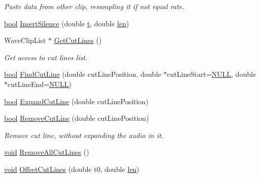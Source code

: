 \begin{DoxyCompactItemize}
\begin{DoxyCompactList}\small\item\em Paste data from other clip, resampling it if not equal rate. \end{DoxyCompactList}\item 
\hyperlink{mac_2config_2i386_2lib-src_2libsoxr_2soxr-config_8h_abb452686968e48b67397da5f97445f5b}{bool} \hyperlink{class_wave_clip_a3c7d2ee22cfb286a588c0f03abc5e470}{Insert\+Silence} (double \hyperlink{octave__test_8m_aaccc9105df5383111407fd5b41255e23}{t}, double \hyperlink{lib_2expat_8h_af86d325fecfc8f47b61fbf5a5146f582}{len})
\item 
Wave\+Clip\+List $\ast$ \hyperlink{class_wave_clip_a1c1ecfe9be3476335a2bf66d80774f03}{Get\+Cut\+Lines} ()
\begin{DoxyCompactList}\small\item\em Get access to cut lines list. \end{DoxyCompactList}\item 
\hyperlink{mac_2config_2i386_2lib-src_2libsoxr_2soxr-config_8h_abb452686968e48b67397da5f97445f5b}{bool} \hyperlink{class_wave_clip_a488b6cd7e76c282a1bf70200beb4d66c}{Find\+Cut\+Line} (double cut\+Line\+Position, double $\ast$cut\+Line\+Start=\hyperlink{px__mixer_8h_a070d2ce7b6bb7e5c05602aa8c308d0c4}{N\+U\+LL}, double $\ast$cut\+Line\+End=\hyperlink{px__mixer_8h_a070d2ce7b6bb7e5c05602aa8c308d0c4}{N\+U\+LL})
\item 
\hyperlink{mac_2config_2i386_2lib-src_2libsoxr_2soxr-config_8h_abb452686968e48b67397da5f97445f5b}{bool} \hyperlink{class_wave_clip_af6c3f9e851393b1197a370b0a499ba85}{Expand\+Cut\+Line} (double cut\+Line\+Position)
\item 
\hyperlink{mac_2config_2i386_2lib-src_2libsoxr_2soxr-config_8h_abb452686968e48b67397da5f97445f5b}{bool} \hyperlink{class_wave_clip_a2c761a03942c1f63e5f6a768ba0af03e}{Remove\+Cut\+Line} (double cut\+Line\+Position)
\begin{DoxyCompactList}\small\item\em Remove cut line, without expanding the audio in it. \end{DoxyCompactList}\item 
\hyperlink{sound_8c_ae35f5844602719cf66324f4de2a658b3}{void} \hyperlink{class_wave_clip_a39a93d0ad31f6e021d2758fa5f8e0b70}{Remove\+All\+Cut\+Lines} ()
\item 
\hyperlink{sound_8c_ae35f5844602719cf66324f4de2a658b3}{void} \hyperlink{class_wave_clip_aa67e6fb537b009d7b2e61d7805093bff}{Offset\+Cut\+Lines} (double t0, double \hyperlink{lib_2expat_8h_af86d325fecfc8f47b61fbf5a5146f582}{len})

\end{DoxyCompactItemize}
